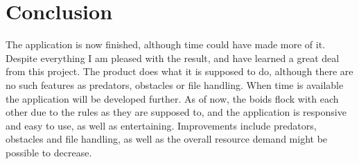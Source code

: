 \documentclass[a4paper,twoside, 10pt]{report}
\begin{document}
\section{Conclusion}
\label{sec:conclusion}
The application is now finished, although time could have made more of it. Despite everything I am pleased with the result, and have learned a great deal from this project. The product does what it is supposed to do, although there are no such features as predators, obstacles or file handling. When time is available the application will be developed further. As of now, the boids flock with each other due to the rules as they are supposed to, and the application is responsive and easy to use, as well as entertaining. Improvements include predators, obstacles and file handling, as well as the overall resource demand might be possible to decrease. 

%
%


%
%

%
\end{document}
